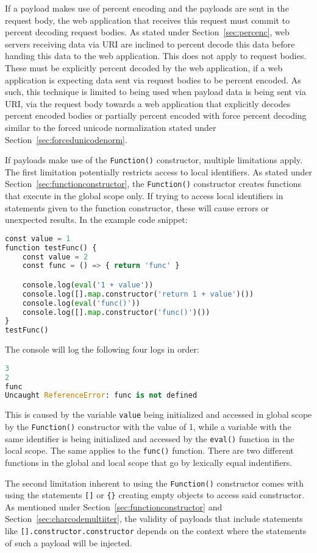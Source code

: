 If a payload makes use of percent encoding and the payloads are sent in the request body, the web application that receives this request must commit to percent decoding request bodies. As stated under Section~\ref{sec:percenc}, web servers receiving data via URI are inclined to percent decode this data before handing this data to the web application. This does not apply to request bodies. These must be explicitly percent decoded by the web application, if a web application is expecting data sent via request bodies to be percent encoded. As such, this technique is limited to being used when payload data is being sent via URI, via the request body towards a web application that explicitly decodes percent encoded bodies or partially percent encoded with force percent decoding similar to the forced unicode normalization stated under Section~\ref{sec:forcedunicodenorm}.

If payloads make use of the \verb|Function()| constructor, multiple limitations apply. The first limitation potentially restricts access to local identifiers. As stated under Section~\ref{sec:functionconstructor}, the \verb|Function()| constructor creates functions that execute in the global scope only. If trying to access local identifiers in statements given to the function constructor, these will cause errors or unexpected results. In the example code snippet:

\begin{lstlisting}[style=basicStyle, language=Python]
const value = 1
function testFunc() {
	const value = 2
	const func = () => { return 'func' }

	console.log(eval('1 + value'))
	console.log([].map.constructor('return 1 + value')())
	console.log(eval('func()'))
	console.log([].map.constructor('func()')())
}
testFunc()
\end{lstlisting}
The console will log the following four logs in order:

\begin{lstlisting}[style=basicStyle, language=Python]
3 
2 
func 
Uncaught ReferenceError: func is not defined
\end{lstlisting}
This is caused by the variable \verb|value| being initialized and accessed in global scope by the \verb|Function()| constructor with the value of 1, while a variable with the same identifier is being initialized and accessed by the \verb|eval()| function in the local scope. The same applies to the \verb|func()| function. There are two different functions in the global and local scope that go by lexically equal indentifiers.

The second limitation inherent to using the \verb|Function()| constructor comes with using the statements \verb|[]| or \verb|{}| creating empty objects to access said constructor. As mentioned under Section~\ref{sec:functionconstructor} and Section~\ref{sec:charcodemultiiter}, the validity of payloads that include statements like \verb|[].constructor.constructor| depends on the context where the statements of such a payload will be injected. 


